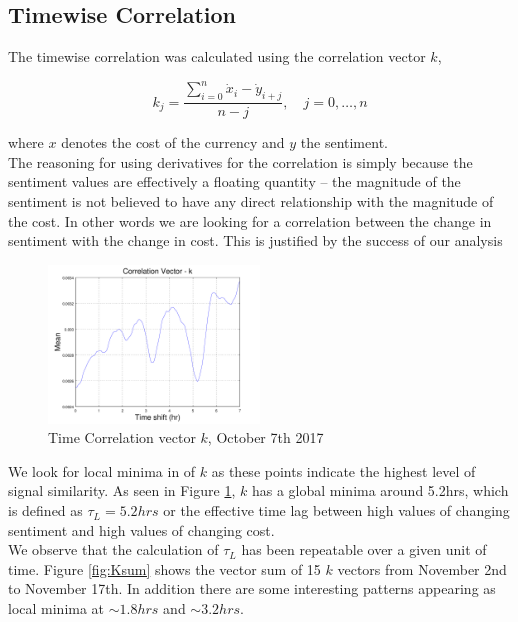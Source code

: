 \documentclass[12pt,journal,compsoc]{IEEEtran}
\begin{document}
\subsection{Timewise Correlation}
The timewise correlation was calculated using the correlation vector $k$,

\begin{equation}\label{eq:K}
k_j = \frac{\sum\limits_{i=0}^n \dot{x}_i - \dot{y}_{i+j}}{n-j},\quad j=0,\dots,n
\end{equation}

\noindent where $x$ denotes the cost of the currency and $y$ the sentiment.\\ 

The reasoning for using derivatives 
for the correlation is simply because the sentiment values are effectively a floating quantity -- 
the magnitude of the sentiment is not believed to have any direct relationship with the magnitude of the cost.
In other words we are looking for a correlation between the change in sentiment with the change in cost. 
This is justified by the success of our analysis\\

\begin{figure}[h]
	\centering
	\includegraphics[width=0.5\textwidth]{../Datasets/Plots/Oct7_K}
	\caption{Time Correlation vector $k$, October 7th 2017}
	\label{fig:K}
\end{figure}

We look for local minima in of $k$ as these points indicate the highest level of signal similarity.
As seen in Figure \ref{fig:K}, $k$ has a global minima around 5.2hrs, which is defined as $\tau_L = 5.2hrs$ 
or the effective time lag between high values of changing sentiment and high values of changing cost.\\

We observe that the calculation of $\tau_L$ has been repeatable over a given unit of time. Figure \ref{fig:Ksum} 
shows the vector sum of 15 $k$ vectors from November 2nd to November 17th. In addition there are some interesting 
patterns appearing as local minima at $\sim1.8hrs$ and $\sim3.2hrs$.
\end{document}

